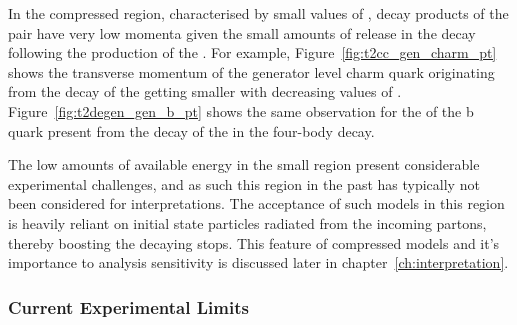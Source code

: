 In the compressed region, characterised by small values of \deltam, decay
products of the \sTop pair have very low momenta given the small amounts of
release in the decay following the production of the \chiz. For example, 
Figure~\ref{fig:t2cc_gen_charm_pt} shows the transverse momentum of the
generator level charm quark originating from the decay of the \sTop getting
smaller
with decreasing values of \deltam. Figure~\ref{fig:t2degen_gen_b_pt} shows the
same observation for the \Pt of the b quark present from the decay of the
\sTop in the four-body decay.

The low amounts of available energy in the small \deltam region present considerable
experimental challenges, and as such this region in the past has typically not
been considered for interpretations. The acceptance of such models in this
region is heavily reliant on initial state particles radiated from the
incoming partons, thereby boosting the decaying stops. This feature of
compressed models and it's importance to analysis sensitivity is discussed
later in chapter~\ref{ch:interpretation}.

\subsubsection{Current Experimental Limits}
\label{sec:current_limits}

